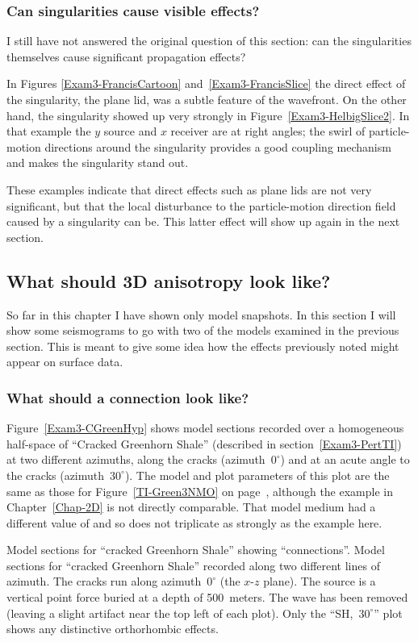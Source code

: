 \subsubsection{Can singularities cause visible effects?}
I still have not answered the original question of this section:
can the singularities themselves cause significant propagation effects?

In Figures \ref{Exam3-FrancisCartoon} and~\ref{Exam3-FrancisSlice}
the direct effect of the singularity, the plane lid, was a subtle
feature of the wavefront.
On the other hand,
the singularity showed up very strongly in Figure~\ref{Exam3-HelbigSlice2}.
In that example the $y$ source and $x$ receiver are at right angles;
the swirl of particle-motion directions around the singularity
provides a good coupling mechanism and makes the singularity stand out.

These examples indicate that direct effects such as plane lids are
not very significant, but that the local disturbance to the particle-motion
direction field caused by a singularity can be.
This latter effect will show up again in the next section.

\subsection{What should 3D anisotropy look like?}
So far in this chapter I have shown only model snapshots.
In this section I will show some seismograms to go with two of the
models examined in the previous section. This is meant to give some
idea how the effects previously noted might appear on surface data.

\subsubsection{What should a connection look like?}
Figure~\ref{Exam3-CGreenHyp} shows model sections recorded over
a homogeneous half-space of ``Cracked Greenhorn Shale''
(described in section~\ref{Exam3-PertTI})
at two different azimuths, along the cracks (azimuth~$0^\circ$)
and at an acute angle to the cracks (azimuth~$30^\circ$).
The model and plot parameters of this plot are the same as those for
Figure~\ref{TI-Green3NMO} on page~\pageref{TI-Green3NMO},
although the example in Chapter~\ref{Chap-2D} is not directly
comparable. That model medium had a different value
of {\cac} and so does not triplicate as strongly as the example here.

{Model sections for ``cracked Greenhorn Shale'' showing ``connections''.}
{
Model sections for ``cracked Greenhorn Shale'' recorded along two
different lines of azimuth.
The cracks run along azimuth~$0^\circ$ (the $x$-$z$ plane).
The source is a vertical point force buried at a depth of 500~meters.
The {\qP} wave has been removed (leaving a slight artifact near the top left
of each plot).
Only the ``SH,~$30^\circ$'' plot shows any distinctive orthorhombic effects.
}

